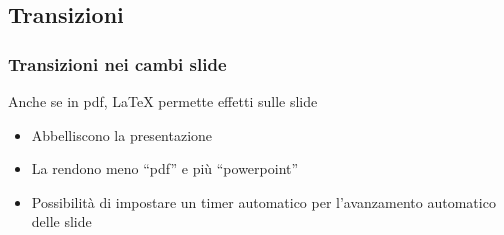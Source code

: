 \subsection{Transizioni} 
\begin{frame}
  \frametitle{Transizioni nei cambi slide}
  
  Anche se in pdf, \LaTeX{} permette effetti sulle slide
  \begin{itemize}
    \item Abbelliscono la presentazione
    \item La rendono meno ``pdf'' e più ``powerpoint''
    \item Possibilità di impostare un timer automatico per l'avanzamento 
automatico delle slide
  \end{itemize}

\end{frame}

